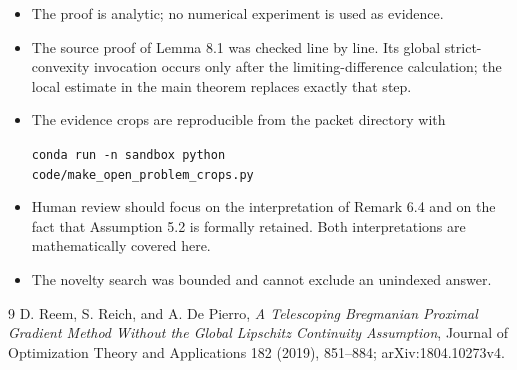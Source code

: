 \documentclass[11pt]{article}
\begin{document}
\begin{itemize}[leftmargin=*]
\item The proof is analytic; no numerical experiment is used as evidence.
\item The source proof of Lemma 8.1 was checked line by line. Its global
strict-convexity invocation occurs only after the limiting-difference
calculation; the local estimate in the main theorem replaces exactly that
step.
\item The evidence crops are reproducible from the packet directory with
\begin{center}
\small\texttt{conda run -n sandbox python}\\
\texttt{code/make\_open\_problem\_crops.py}
\end{center}
\item Human review should focus on the interpretation of Remark 6.4 and on
the fact that Assumption 5.2 is formally retained. Both interpretations are
mathematically covered here.
\item The novelty search was bounded and cannot exclude an unindexed answer.
\end{itemize}

\begin{thebibliography}{9}
D. Reem, S. Reich, and A. De Pierro,
\emph{A Telescoping Bregmanian Proximal Gradient Method Without the Global
Lipschitz Continuity Assumption}, Journal of Optimization Theory and
Applications 182 (2019), 851--884; arXiv:1804.10273v4.
\end{thebibliography}
\end{document}
